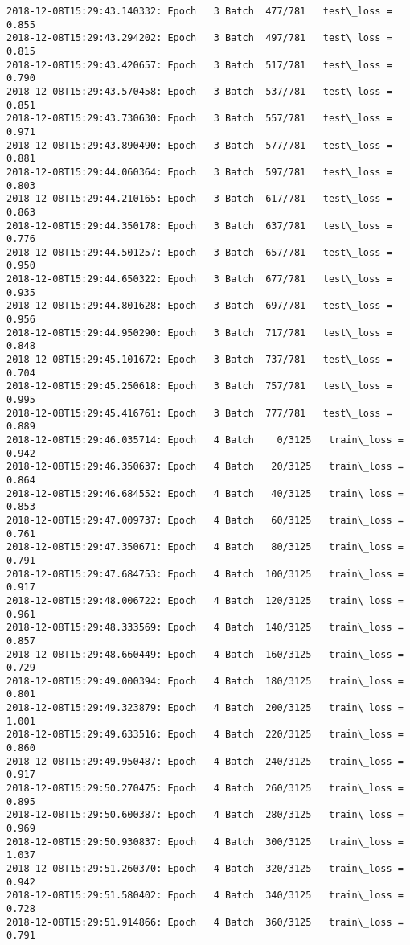 \documentclass[11pt]{article}
\begin{document}
\begin{Verbatim}[commandchars=\\\{\}]
2018-12-08T15:29:43.140332: Epoch   3 Batch  477/781   test\_loss = 0.855
2018-12-08T15:29:43.294202: Epoch   3 Batch  497/781   test\_loss = 0.815
2018-12-08T15:29:43.420657: Epoch   3 Batch  517/781   test\_loss = 0.790
2018-12-08T15:29:43.570458: Epoch   3 Batch  537/781   test\_loss = 0.851
2018-12-08T15:29:43.730630: Epoch   3 Batch  557/781   test\_loss = 0.971
2018-12-08T15:29:43.890490: Epoch   3 Batch  577/781   test\_loss = 0.881
2018-12-08T15:29:44.060364: Epoch   3 Batch  597/781   test\_loss = 0.803
2018-12-08T15:29:44.210165: Epoch   3 Batch  617/781   test\_loss = 0.863
2018-12-08T15:29:44.350178: Epoch   3 Batch  637/781   test\_loss = 0.776
2018-12-08T15:29:44.501257: Epoch   3 Batch  657/781   test\_loss = 0.950
2018-12-08T15:29:44.650322: Epoch   3 Batch  677/781   test\_loss = 0.935
2018-12-08T15:29:44.801628: Epoch   3 Batch  697/781   test\_loss = 0.956
2018-12-08T15:29:44.950290: Epoch   3 Batch  717/781   test\_loss = 0.848
2018-12-08T15:29:45.101672: Epoch   3 Batch  737/781   test\_loss = 0.704
2018-12-08T15:29:45.250618: Epoch   3 Batch  757/781   test\_loss = 0.995
2018-12-08T15:29:45.416761: Epoch   3 Batch  777/781   test\_loss = 0.889
2018-12-08T15:29:46.035714: Epoch   4 Batch    0/3125   train\_loss = 0.942
2018-12-08T15:29:46.350637: Epoch   4 Batch   20/3125   train\_loss = 0.864
2018-12-08T15:29:46.684552: Epoch   4 Batch   40/3125   train\_loss = 0.853
2018-12-08T15:29:47.009737: Epoch   4 Batch   60/3125   train\_loss = 0.761
2018-12-08T15:29:47.350671: Epoch   4 Batch   80/3125   train\_loss = 0.791
2018-12-08T15:29:47.684753: Epoch   4 Batch  100/3125   train\_loss = 0.917
2018-12-08T15:29:48.006722: Epoch   4 Batch  120/3125   train\_loss = 0.961
2018-12-08T15:29:48.333569: Epoch   4 Batch  140/3125   train\_loss = 0.857
2018-12-08T15:29:48.660449: Epoch   4 Batch  160/3125   train\_loss = 0.729
2018-12-08T15:29:49.000394: Epoch   4 Batch  180/3125   train\_loss = 0.801
2018-12-08T15:29:49.323879: Epoch   4 Batch  200/3125   train\_loss = 1.001
2018-12-08T15:29:49.633516: Epoch   4 Batch  220/3125   train\_loss = 0.860
2018-12-08T15:29:49.950487: Epoch   4 Batch  240/3125   train\_loss = 0.917
2018-12-08T15:29:50.270475: Epoch   4 Batch  260/3125   train\_loss = 0.895
2018-12-08T15:29:50.600387: Epoch   4 Batch  280/3125   train\_loss = 0.969
2018-12-08T15:29:50.930837: Epoch   4 Batch  300/3125   train\_loss = 1.037
2018-12-08T15:29:51.260370: Epoch   4 Batch  320/3125   train\_loss = 0.942
2018-12-08T15:29:51.580402: Epoch   4 Batch  340/3125   train\_loss = 0.728
2018-12-08T15:29:51.914866: Epoch   4 Batch  360/3125   train\_loss = 0.791

\end{Verbatim}
\end{document}
